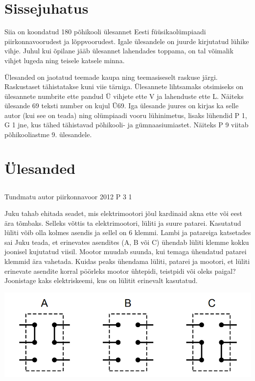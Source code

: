 \documentclass[11pt]{article}
\begin{document}
{\setlength{\parindent}{24pt}
\section{Sissejuhatus}

Siia on koondatud 180 põhikooli ülesannet Eesti füüsikaolümpiaadi piirkonnavoorudest ja lõppvoorudest.
Igale ülesandele on juurde kirjutatud lühike vihje.
Juhul kui õpilane jääb ülesannet lahendades toppama, on tal võimalik vihjet lugeda ning teisele katsele minna.

Ülesanded on jaotatud teemade kaupa ning teemasiseselt raskuse järgi. Raskustaset tähistatakse kuni viie tärniga.
Ülesannete lihtsamaks otsimiseks on ülesannete numbrite ette pandud Ü vihjete ette V ja lahenduste ette L.
Näiteks ülesande 69 teksti number on kujul Ü69.
Iga ülesande juures on kirjas ka selle autor (kui see on teada) ning olümpiaadi vooru lühinimetus, lisaks lühendid P 1, G 1 jne, kus tähed tähistavad põhikooli- ja gümnaasiumiastet.
Näiteks P 9 viitab põhikooliastme 9. ülesandele.
\newpage
\setlength{\parindent}{0pt}

        \section{Ülesanded}
        \ToggleStatement
        \subsection{\protect{}}

\graphicspath{{Kogumik_new/}}

{Tundmatu autor} %
{piirkonnavoor} %
{2012} %
{P 3} %
{1} %
{
\ifStatement
Juku tahab ehitada seadet, mis elektrimootori jõul kardinaid akna ette või eest ära tõmbaks. Selleks võttis ta elektrimootori, lüliti ja suure patarei. Kasutatud lüliti võib olla kolmes asendis ja sellel on 6 klemmi. Lambi ja patareiga katsetades sai Juku teada, et erinevates asendites (A, B või C) ühendab lüliti klemme kokku joonisel kujutatud viisil. Mootor muudab suunda, kui temaga ühendatud patarei klemmid ära vahetada. Kuidas peaks ühendama lüliti, patarei ja mootori, et lüliti erinevate asendite korral pöörleks mootor ühtepidi, teistpidi või oleks  paigal? Joonistage kaks elektriskeemi, kus on lülitit erinevalt kasutatud.
\begin{center}
	\includegraphics[width=0.5\linewidth]{2012-v2p-03-yl.png}
\end{center}
\fi
}

}
\end{document}
